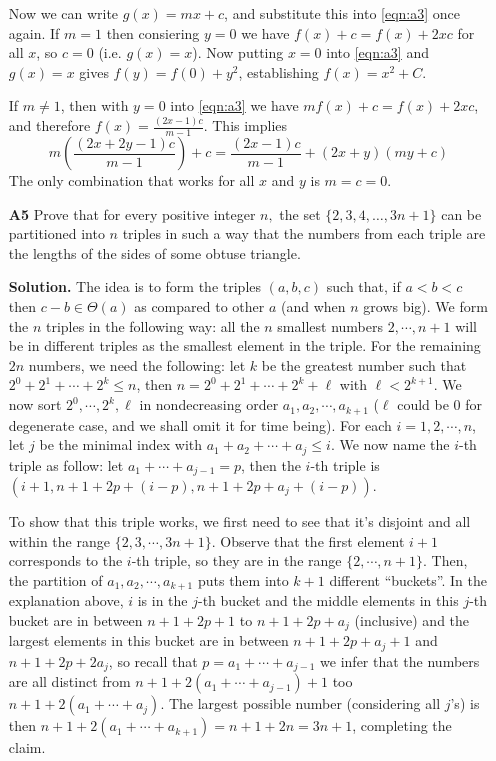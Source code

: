 \documentclass[11pt,a4paper]{article}
\begin{document}
\begin{enumerate}
	Now we can write $g(x)=mx+c$, 
	and substitute this into \ref{eqn:a3} once again. 
	If $m=1$ then consiering $y=0$ we have $f(x)+c=f(x)+2xc$ for all $x$, 
	so $c=0$ (i.e. $g(x)=x$). 
	Now putting $x=0$ into \ref{eqn:a3} and $g(x)=x$ gives $f(y)=f(0)+y^2$, 
	establishing $f(x)=x^2+C$. 
	
	If $m\neq 1$, then with $y=0$ into \ref{eqn:a3} we have $mf(x)+c=f(x)+2xc$, 
	and therefore $f(x)=\frac{(2x-1)c}{m-1}$. 
	This implies 
	\[
	m\left(\frac{(2x+2y-1)c}{m-1}\right)+c
	=\frac{(2x-1)c}{m-1} + (2x+y)(my+c)
	\]
	The only combination that works for all $x$ and $y$ is $m=c=0$. 
	
	\item[\textbf{A5}] Prove that for every positive integer $n,$ the set $\{2,3,4,\ldots,3n+1\}$ can be partitioned into $n$ triples in such a way that the numbers from each triple are the lengths of the sides of some obtuse triangle.
	
	\textbf{Solution.} 
	The idea is to form the triples $(a, b, c)$ such that, if $a<b<c$ then $c-b\in\Theta(a)$ as compared to other $a$ (and when $n$ grows big). We form the $n$ triples in the following way: all the $n$ smallest numbers $2, \cdots , n+1$ will be in different triples as the smallest element in the triple. For the remaining $2n$ numbers, we need the following: let $k$ be the greatest number such that $2^0+2^1+\cdots + 2^k\le n$, then $n=2^0+2^1+\cdots + 2^k+\ell$ with $\ell < 2^{k+1}$. 
	We now sort $2^0, \cdots , 2^k, \ell$ in nondecreasing order $a_1, a_2, \cdots , a_{k+1}$ ($\ell$ could be 0 for degenerate case, and we shall omit it for time being). 
	For each $i=1, 2, \cdots , n$, let $j$ be the minimal index with $a_1+a_2+\cdots + a_j\le i$. 
	We now name the $i$-th triple as follow: let $a_1+\cdots + a_{j-1}=p$, then the $i$-th triple is $(i+1, n+1+2p+(i-p), n+1+2p+a_j+(i-p))$. 
	
	To show that this triple works, we first need to see that it's disjoint and all within the range $\{2, 3, \cdots , 3n+1\}$. Observe that the first element $i+1$ corresponds to the $i$-th triple, so they are in the range $\{2, \cdots , n+1\}$. Then, the partition of $a_1, a_2, \cdots , a_{k+1}$ puts them into $k+1$ different ``buckets''. In the explanation above, $i$ is in the $j$-th bucket and the middle elements in this $j$-th bucket are in between $n+1+2p+1$ to $n+1+2p+a_j$ (inclusive) and the largest elements in this bucket are in between $n+1+2p+a_j+1$ and $n+1+2p+2a_j$, so recall that $p=a_1+\cdots + a_{j-1}$ we infer that the numbers are all distinct from $n+1+2(a_1+\cdots + a_{j-1})+1$ too $n+1+2(a_1+\cdots + a_j)$. The largest possible number (considering all $j$'s) is then $n+1+2(a_1+\cdots + a_{k+1})=n+1+2n=3n+1$, completing the claim. 
	

\end{enumerate}
\end{document}
